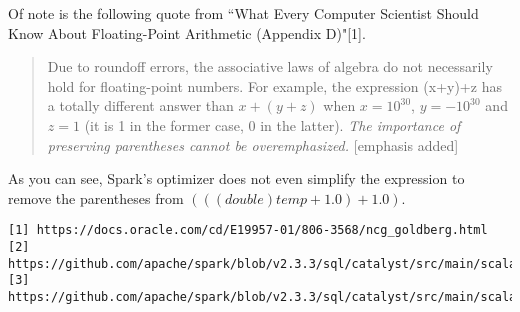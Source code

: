 \documentclass[12pt]{article}
\begin{document}
Of note is the following quote from ``What Every Computer Scientist Should Know About Floating-Point Arithmetic (Appendix D)"[1]. 

\begin{quote}
Due to roundoff errors, the associative laws of algebra do not necessarily hold for floating-point numbers. For example, the expression (x+y)+z has a totally different answer than $x+(y+z)$ when $x = 10^{30}$, $y = -10^{30}$ and $z = 1$ (it is 1 in the former case, 0 in the latter). \textit{The importance of preserving parentheses cannot be overemphasized.} [emphasis added]
\end{quote}

As you can see, Spark's optimizer does not even simplify the expression to remove the parentheses from $(((double)temp + 1.0) + 1.0)$.

\begin{tiny}
\begin{verbatim}
[1] https://docs.oracle.com/cd/E19957-01/806-3568/ncg_goldberg.html
[2] https://github.com/apache/spark/blob/v2.3.3/sql/catalyst/src/main/scala/org/apache/spark/sql/catalyst/optimizer/expressions.scala#L156
[3] https://github.com/apache/spark/blob/v2.3.3/sql/catalyst/src/main/scala/org/apache/spark/sql/catalyst/optimizer/expressions.scala#L188
\end{verbatim}
\end{tiny}
\end{document}
